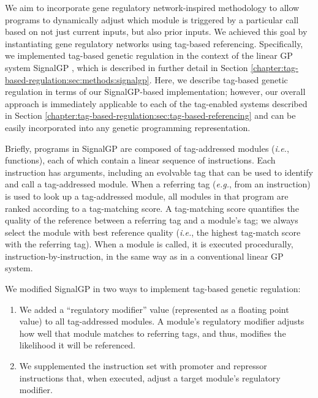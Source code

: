 We aim to incorporate gene regulatory network-inspired methodology to allow programs to dynamically adjust which module is triggered by a particular call based on not just current inputs, but also prior inputs.
We achieved this goal by instantiating gene regulatory networks using tag-based referencing.
Specifically, we implemented tag-based genetic regulation in the context of the linear GP system SignalGP \citep{lalejini_evolving_2018}, which is described in further detail in Section \ref{chapter:tag-based-regulation:sec:methods:signalgp}.
Here, we describe tag-based genetic regulation in terms of our SignalGP-based implementation; however, our overall approach is immediately applicable to each of the tag-enabled systems described in Section \ref{chapter:tag-based-regulation:sec:tag-based-referencing} and can be easily incorporated into any genetic programming representation.

Briefly, programs in SignalGP are composed of tag-addressed modules (\textit{i.e.}, functions), each of which contain a linear sequence of instructions. 
Each instruction has arguments, including an evolvable tag that can be used to identify and call a tag-addressed module.
When a referring tag (\textit{e.g.}, from an instruction) is used to look up a tag-addressed module, all modules in that program are ranked according to a tag-matching score. 
A tag-matching score quantifies the quality of the reference between a referring tag and a module's tag; we always select the module with best reference quality (\textit{i.e.}, the highest tag-match score with the referring tag).
When a module is called, it is executed procedurally, instruction-by-instruction, in the same way as in a conventional linear GP system. 



We modified SignalGP in two ways to implement tag-based genetic regulation: 

\begin{enumerate}
    \item We added a ``regulatory modifier'' value (represented as a floating point value) to all tag-addressed modules. A module's regulatory modifier adjusts how well that module matches to referring tags, and thus, modifies the likelihood it will be referenced.
    \item We supplemented the instruction set with promoter and repressor instructions that, when executed, adjust a target module's regulatory modifier. 
\end{enumerate} 

